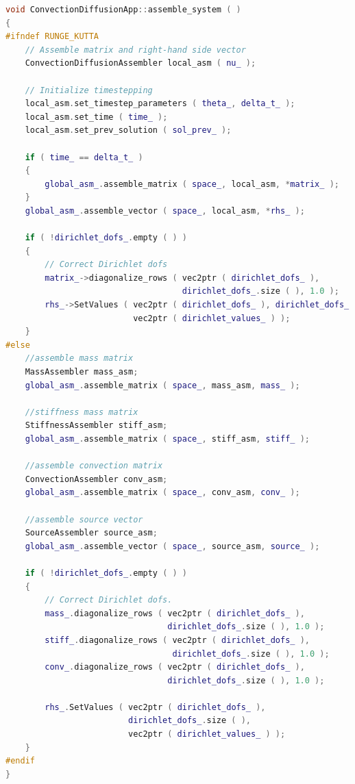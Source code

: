 \documentclass[a4paper, 11pt, twoside]{article}
\begin{document}
\begin{lstlisting}[language=C++, basicstyle={\footnotesize, \ttfamily}, keywordstyle=\color{blue}, numbers=none, tabsize=4]
void ConvectionDiffusionApp::assemble_system ( )
{
#ifndef RUNGE_KUTTA
    // Assemble matrix and right-hand side vector
    ConvectionDiffusionAssembler local_asm ( nu_ );

    // Initialize timestepping
    local_asm.set_timestep_parameters ( theta_, delta_t_ );
    local_asm.set_time ( time_ );
    local_asm.set_prev_solution ( sol_prev_ );

    if ( time_ == delta_t_ )
    {
        global_asm_.assemble_matrix ( space_, local_asm, *matrix_ );
    }
    global_asm_.assemble_vector ( space_, local_asm, *rhs_ );

    if ( !dirichlet_dofs_.empty ( ) )
    {
        // Correct Dirichlet dofs
        matrix_->diagonalize_rows ( vec2ptr ( dirichlet_dofs_ ),
                                    dirichlet_dofs_.size ( ), 1.0 );
        rhs_->SetValues ( vec2ptr ( dirichlet_dofs_ ), dirichlet_dofs_.size ( ),
                          vec2ptr ( dirichlet_values_ ) );
    }
#else
    //assemble mass matrix
    MassAssembler mass_asm;
    global_asm_.assemble_matrix ( space_, mass_asm, mass_ );

    //stiffness mass matrix
    StiffnessAssembler stiff_asm;
    global_asm_.assemble_matrix ( space_, stiff_asm, stiff_ );

    //assemble convection matrix
    ConvectionAssembler conv_asm;
    global_asm_.assemble_matrix ( space_, conv_asm, conv_ );

    //assemble source vector
    SourceAssembler source_asm;
    global_asm_.assemble_vector ( space_, source_asm, source_ );

    if ( !dirichlet_dofs_.empty ( ) )
    {
        // Correct Dirichlet dofs.
        mass_.diagonalize_rows ( vec2ptr ( dirichlet_dofs_ ), 
                                 dirichlet_dofs_.size ( ), 1.0 );
        stiff_.diagonalize_rows ( vec2ptr ( dirichlet_dofs_ ), 
                                  dirichlet_dofs_.size ( ), 1.0 );
        conv_.diagonalize_rows ( vec2ptr ( dirichlet_dofs_ ), 
                                 dirichlet_dofs_.size ( ), 1.0 );

        rhs_.SetValues ( vec2ptr ( dirichlet_dofs_ ), 
                         dirichlet_dofs_.size ( ),
                         vec2ptr ( dirichlet_values_ ) );
    }
#endif
}
\end{lstlisting}
\end{document}
